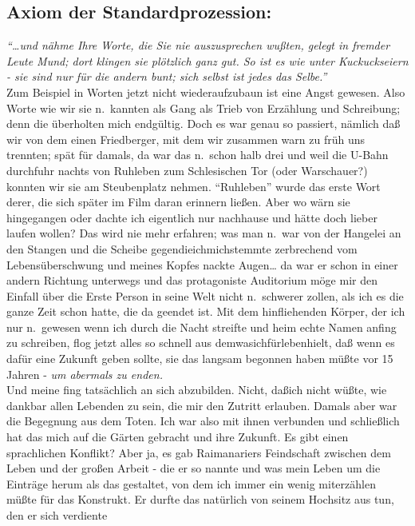 \documentclass[
]{article}
\author{}
\date{\vspace{-2.5em}}
\begin{document}
\subsection{Axiom der
Standardprozession:}\label{axiom-der-standardprozession}

\emph{``\ldots und nähme Ihre Worte, die Sie nie auszusprechen wußten,
gelegt in fremder Leute Mund; dort klingen sie plötzlich ganz gut. So
ist es wie unter Kuckuckseiern - sie sind nur für die andern bunt; sich
selbst ist jedes das Selbe.''}\\
Zum Beispiel in Worten jetzt nicht wiederaufzubaun ist eine Angst
gewesen. Also Worte wie wir sie n.~kannten als Gang als Trieb von
Erzählung und Schreibung; denn die überholten mich endgültig. Doch es
war genau so passiert, nämlich daß wir von dem einen Friedberger, mit
dem wir zusammen warn zu früh uns trennten; spät für damals, da war das
n.~schon halb drei und weil die U-Bahn durchfuhr nachts von Ruhleben zum
Schlesischen Tor (oder Warschauer?) konnten wir sie am Steubenplatz
nehmen. ``Ruhleben'' wurde das erste Wort derer, die sich später im Film
daran erinnern ließen. Aber wo wärn sie hingegangen oder dachte ich
eigentlich nur nachhause und hätte doch lieber laufen wollen? Das wird
nie mehr erfahren; was man n.~war von der Hangelei an den Stangen und
die Scheibe gegendieichmichstemmte zerbrechend vom Lebensüberschwung und
meines Kopfes nackte Augen\ldots{} da war er schon in einer andern
Richtung unterwegs und das protagoniste Auditorium möge mir den Einfall
über die Erste Person in seine Welt nicht n.~schwerer zollen, als ich es
die ganze Zeit schon hatte, die da geendet ist. Mit dem hinfliehenden
Körper, der ich nur n.~gewesen wenn ich durch die Nacht streifte und
heim echte Namen anfing zu schreiben, flog jetzt alles so schnell aus
demwasichfürlebenhielt, daß wenn es dafür eine Zukunft geben sollte, sie
das langsam begonnen haben müßte vor 15 Jahren - \emph{um abermals zu
enden.}\\
Und meine fing tatsächlich an sich abzubilden. Nicht, daßich nicht
wüßte, wie dankbar allen Lebenden zu sein, die mir den Zutritt erlauben.
Damals aber war die Begegnung aus dem Toten. Ich war also mit ihnen
verbunden und schließlich hat das mich auf die Gärten gebracht und ihre
Zukunft. Es gibt einen sprachlichen Konflikt? Aber ja, es gab
Raimanariers Feindschaft zwischen dem Leben und der großen Arbeit - die
er so nannte und was mein Leben um die Einträge herum als das gestaltet,
von dem ich immer ein wenig miterzählen müßte für das Konstrukt. Er
durfte das natürlich von seinem Hochsitz aus tun, den er sich verdiente
\end{document}
